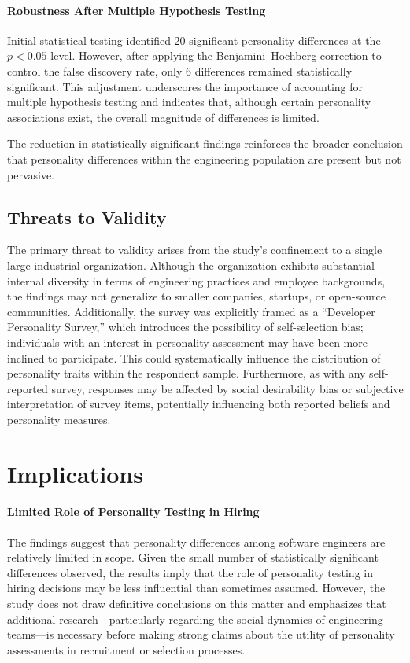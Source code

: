 \paragraph{Robustness After Multiple Hypothesis Testing}
Initial statistical testing identified 20 significant personality differences at the $p < 0.05$ level. However, after applying the Benjamini–Hochberg correction to control the false discovery rate, only 6 differences remained statistically significant. This adjustment underscores the importance of accounting for multiple hypothesis testing and indicates that, although certain personality associations exist, the overall magnitude of differences is limited.

The reduction in statistically significant findings reinforces the broader conclusion that personality differences within the engineering population are present but not pervasive.

\subsection{Threats to Validity}
The primary threat to validity arises from the study’s confinement to a single large industrial organization. Although the organization exhibits substantial internal diversity in terms of engineering practices and employee backgrounds, the findings may not generalize to smaller companies, startups, or open-source communities. Additionally, the survey was explicitly framed as a “Developer Personality Survey,” which introduces the possibility of self-selection bias; individuals with an interest in personality assessment may have been more inclined to participate. This could systematically influence the distribution of personality traits within the respondent sample. Furthermore, as with any self-reported survey, responses may be affected by social desirability bias or subjective interpretation of survey items, potentially influencing both reported beliefs and personality measures.

\section{Implications}
\paragraph{Limited Role of Personality Testing in Hiring}
The findings suggest that personality differences among software engineers are relatively limited in scope. Given the small number of statistically significant differences observed, the results imply that the role of personality testing in hiring decisions may be less influential than sometimes assumed. However, the study does not draw definitive conclusions on this matter and emphasizes that additional research—particularly regarding the social dynamics of engineering teams—is necessary before making strong claims about the utility of personality assessments in recruitment or selection processes.

